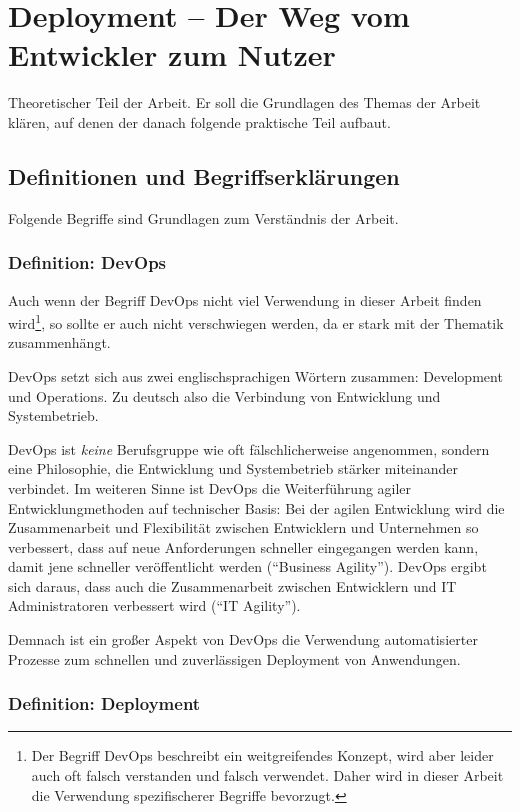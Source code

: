 \chapter{Deployment – Der Weg vom Entwickler zum Nutzer}

Theoretischer Teil der Arbeit. Er soll die Grundlagen des Themas der Arbeit klären, auf denen der danach folgende praktische Teil aufbaut.


\section{Definitionen und Begriffserklärungen}

Folgende Begriffe sind Grundlagen zum Verständnis der Arbeit.

\subsection{Definition: DevOps}

Auch wenn der Begriff DevOps nicht viel Verwendung in dieser Arbeit finden wird\footnote{Der Begriff DevOps beschreibt ein weitgreifendes Konzept, wird aber leider auch oft falsch verstanden und falsch verwendet. Daher wird in dieser Arbeit die Verwendung spezifischerer Begriffe bevorzugt.}, so sollte er auch nicht verschwiegen werden, da er stark mit der Thematik zusammenhängt.

DevOps setzt sich aus zwei englischsprachigen Wörtern zusammen: Development und Operations. Zu deutsch also die Verbindung von Entwicklung und Systembetrieb.

DevOps ist \emph{keine} Berufsgruppe wie oft fälschlicherweise angenommen, sondern eine Philosophie, die Entwicklung und Systembetrieb stärker miteinander verbindet. Im weiteren Sinne ist DevOps die Weiterführung agiler Entwicklungmethoden auf technischer Basis: Bei der agilen Entwicklung wird die Zusammenarbeit und Flexibilität zwischen Entwicklern und Unternehmen so verbessert, dass auf neue Anforderungen schneller eingegangen werden kann, damit jene schneller veröffentlicht werden (``Business Agility''). DevOps ergibt sich daraus, dass auch die Zusammenarbeit zwischen Entwicklern und IT Administratoren verbessert wird (``IT Agility''). \citep[4f]{Chapman2014}

Demnach ist ein großer Aspekt von DevOps die Verwendung automatisierter Prozesse zum schnellen und zuverlässigen Deployment von Anwendungen.

\subsection{Definition: Deployment}

